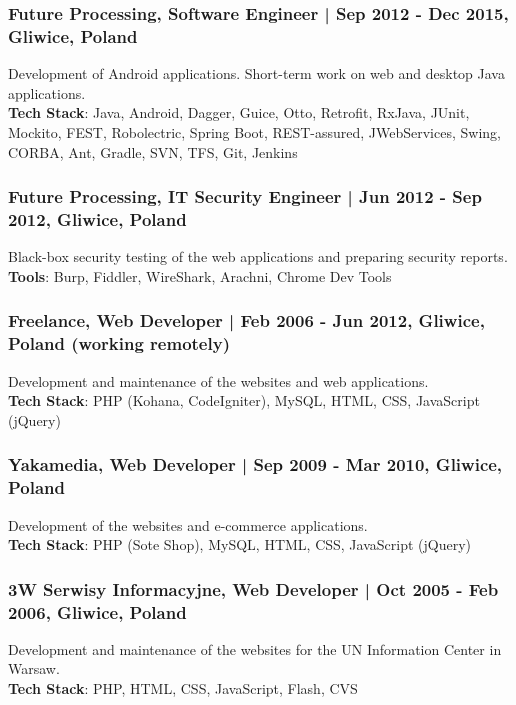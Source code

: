 \documentclass[8pt]{extarticle}
\begin{document}
      \subsubsection*{\normalsize{Future Processing, Software Engineer | Sep 2012 - Dec 2015, Gliwice, Poland}}
      Development of Android applications. Short-term work on web and desktop Java applications.\\
      \textbf{Tech Stack}: Java, Android, Dagger, Guice, Otto, Retrofit, RxJava,
      JUnit, Mockito, FEST, Robolectric, Spring Boot, REST-assured, JWebServices,
      Swing, CORBA, Ant, Gradle, SVN, TFS, Git, Jenkins

      \subsubsection*{\normalsize{Future Processing, IT Security Engineer | Jun 2012 - Sep 2012, Gliwice, Poland}}
      Black-box security testing of the web applications and preparing security reports.\\
      \textbf{Tools}: Burp, Fiddler, WireShark, Arachni, Chrome Dev Tools

      \subsubsection*{\normalsize{Freelance, Web Developer | Feb 2006 - Jun 2012, Gliwice, Poland (working remotely)}}
      Development and maintenance of the websites and web applications.\\
      \textbf{Tech Stack}: PHP (Kohana, CodeIgniter), MySQL, HTML, CSS, JavaScript (jQuery)

      \subsubsection*{\normalsize{Yakamedia, Web Developer | Sep 2009 - Mar 2010, Gliwice, Poland}}
      Development of the websites and e-commerce applications.\\
      \textbf{Tech Stack}: PHP (Sote Shop), MySQL, HTML, CSS, JavaScript (jQuery)

      \subsubsection*{\normalsize{3W Serwisy Informacyjne, Web Developer | Oct 2005 - Feb 2006, Gliwice, Poland}}
      Development and maintenance of the websites for the UN Information Center in Warsaw.\\
      \textbf{Tech Stack}: PHP, HTML, CSS, JavaScript, Flash, CVS
\end{document}
